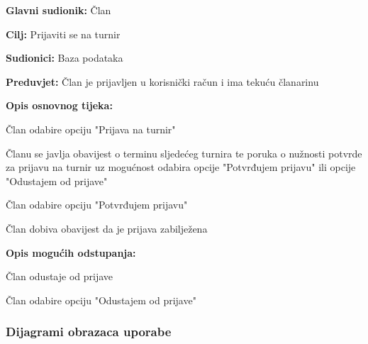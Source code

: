 	\noindent {}
	\begin{packed_item}
		
		\item \textbf{Glavni sudionik: } Član
		\item  \textbf{Cilj: } Prijaviti se na turnir
		\item  \textbf{Sudionici: } Baza podataka
		\item  \textbf{Preduvjet: } Član je prijavljen u korisnički račun i ima tekuću članarinu
		\item  \textbf{Opis osnovnog tijeka:}
		
		\item[] \begin{packed_enum}
			
			\item Član odabire opciju "Prijava na turnir"
			\item Članu se javlja obavijest o terminu sljedećeg turnira te poruka o nužnosti potvrde za prijavu na turnir uz mogućnost odabira opcije "Potvrđujem prijavu" ili opcije "Odustajem od prijave"
			\item Član odabire opciju "Potvrđujem prijavu"
			\item Član dobiva obavijest da je prijava zabilježena
			
		\end{packed_enum}
		
		\item  \textbf{Opis mogućih odstupanja:}
		
		\item[] \begin{packed_item}
			
			\item[2.a] Član odustaje od prijave
			\item[] \begin{packed_enum}
				
				\item Član odabire opciju "Odustajem od prijave"
				
			\end{packed_enum}
			
		\end{packed_item}
	\end{packed_item}
				\subsubsection{Dijagrami obrazaca uporabe}
					
